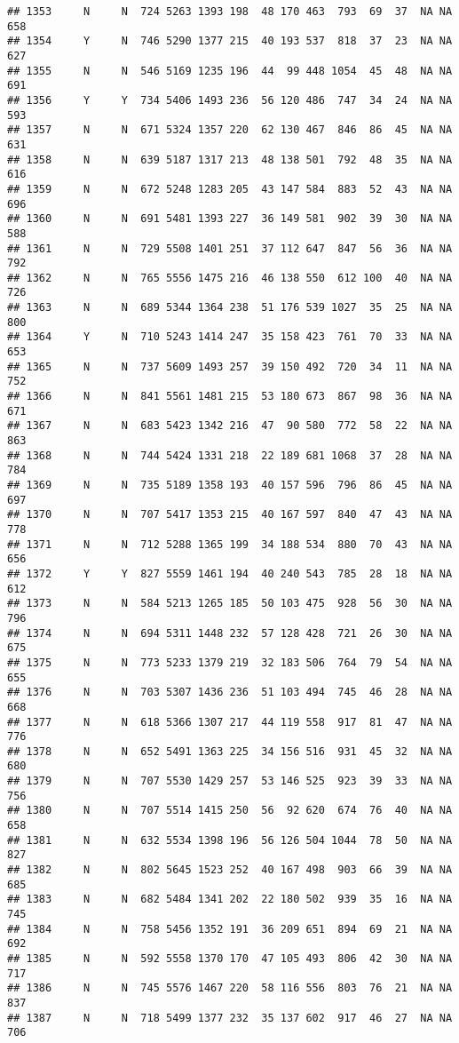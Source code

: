 \documentclass[]{article}
\begin{document}
\begin{verbatim}
## 1353     N     N  724 5263 1393 198  48 170 463  793  69  37  NA NA  658
## 1354     Y     N  746 5290 1377 215  40 193 537  818  37  23  NA NA  627
## 1355     N     N  546 5169 1235 196  44  99 448 1054  45  48  NA NA  691
## 1356     Y     Y  734 5406 1493 236  56 120 486  747  34  24  NA NA  593
## 1357     N     N  671 5324 1357 220  62 130 467  846  86  45  NA NA  631
## 1358     N     N  639 5187 1317 213  48 138 501  792  48  35  NA NA  616
## 1359     N     N  672 5248 1283 205  43 147 584  883  52  43  NA NA  696
## 1360     N     N  691 5481 1393 227  36 149 581  902  39  30  NA NA  588
## 1361     N     N  729 5508 1401 251  37 112 647  847  56  36  NA NA  792
## 1362     N     N  765 5556 1475 216  46 138 550  612 100  40  NA NA  726
## 1363     N     N  689 5344 1364 238  51 176 539 1027  35  25  NA NA  800
## 1364     Y     N  710 5243 1414 247  35 158 423  761  70  33  NA NA  653
## 1365     N     N  737 5609 1493 257  39 150 492  720  34  11  NA NA  752
## 1366     N     N  841 5561 1481 215  53 180 673  867  98  36  NA NA  671
## 1367     N     N  683 5423 1342 216  47  90 580  772  58  22  NA NA  863
## 1368     N     N  744 5424 1331 218  22 189 681 1068  37  28  NA NA  784
## 1369     N     N  735 5189 1358 193  40 157 596  796  86  45  NA NA  697
## 1370     N     N  707 5417 1353 215  40 167 597  840  47  43  NA NA  778
## 1371     N     N  712 5288 1365 199  34 188 534  880  70  43  NA NA  656
## 1372     Y     Y  827 5559 1461 194  40 240 543  785  28  18  NA NA  612
## 1373     N     N  584 5213 1265 185  50 103 475  928  56  30  NA NA  796
## 1374     N     N  694 5311 1448 232  57 128 428  721  26  30  NA NA  675
## 1375     N     N  773 5233 1379 219  32 183 506  764  79  54  NA NA  655
## 1376     N     N  703 5307 1436 236  51 103 494  745  46  28  NA NA  668
## 1377     N     N  618 5366 1307 217  44 119 558  917  81  47  NA NA  776
## 1378     N     N  652 5491 1363 225  34 156 516  931  45  32  NA NA  680
## 1379     N     N  707 5530 1429 257  53 146 525  923  39  33  NA NA  756
## 1380     N     N  707 5514 1415 250  56  92 620  674  76  40  NA NA  658
## 1381     N     N  632 5534 1398 196  56 126 504 1044  78  50  NA NA  827
## 1382     N     N  802 5645 1523 252  40 167 498  903  66  39  NA NA  685
## 1383     N     N  682 5484 1341 202  22 180 502  939  35  16  NA NA  745
## 1384     N     N  758 5456 1352 191  36 209 651  894  69  21  NA NA  692
## 1385     N     N  592 5558 1370 170  47 105 493  806  42  30  NA NA  717
## 1386     N     N  745 5576 1467 220  58 116 556  803  76  21  NA NA  837
## 1387     N     N  718 5499 1377 232  35 137 602  917  46  27  NA NA  706

\end{verbatim}
\end{document}
